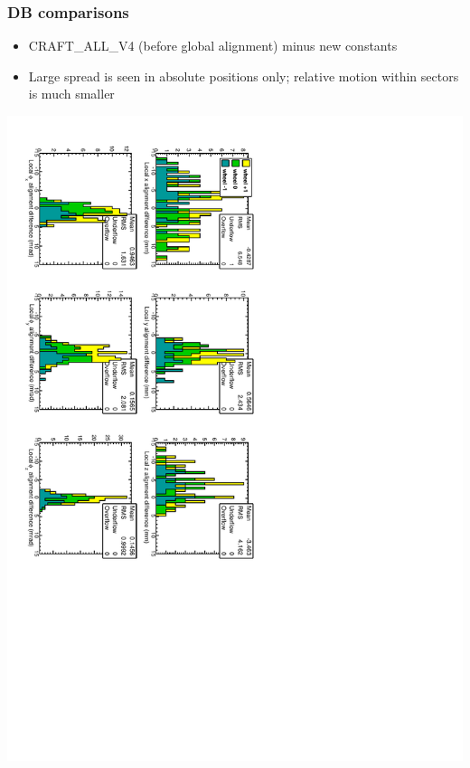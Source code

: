\documentclass[compress]{beamer}
\begin{document}
\begin{frame}
\frametitle{DB comparisons}

\begin{itemize}
\item CRAFT\_ALL\_V4 (before global alignment) minus new constants
\item Large spread is seen in absolute positions only; relative motion
  within sectors is much smaller
\end{itemize}

\vfill\includegraphics[height=\linewidth, angle=90]{hip_difference_v4.pdf}
\end{frame}
\end{document}
